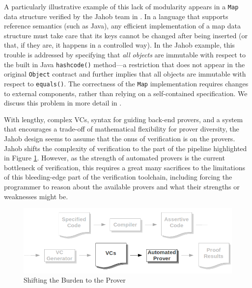 A particularly illustrative example of this lack of modularity appears in a \texttt{Map} data structure verified by the Jahob team in \cite{zee:annotations}.  In a language that supports reference semantics (such as Java), any efficient implementation of a map data structure must take care that its keys cannot be changed after being inserted (or that, if they are, it happens in a controlled way).  In the Jahob example, this trouble is addressed by specifying that \emph{all objects} are immutable with respect to the built in Java \texttt{hashcode()} method---a restriction that does not appear in the original \texttt{Object} contract and further implies that all objects are immutable with respect to \texttt{equals()}.  The correctness of the \texttt{Map} implementation requires changes to external components, rather than relying on a self-contained specification.  We discuss this problem in more detail in \cite{bronishMap}.

\vspace{1.5em}With lengthy, complex VCs, syntax for guiding back-end provers, and a system that encourages a trade-off of mathematical flexibility for prover diversity, the Jahob design seems to assume that the onus of verification is on the provers.  Jahob shifts the complexity of verification to the part of the pipeline highlighted in Figure \ref{fig:prover}.  However, as the strength of automated provers is the current bottleneck of verification, this requires a great many sacrifices to the limitations of this bleeding-edge part of the verification toolchain, including forcing the programmer to reason about the available provers and what their strengths or weaknesses might be.

\begin{figure}
  \centering
    \includegraphics[width=\textwidth]{proverpart}
  \caption{Shifting the Burden to the Prover\label{fig:prover}}
\end{figure}

